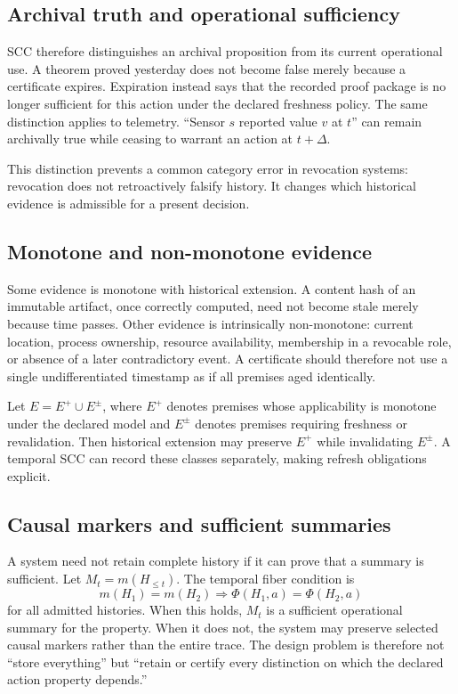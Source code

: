 \documentclass[11pt]{article}
\begin{document}
\subsection{Archival truth and operational sufficiency}
SCC therefore distinguishes an archival proposition from its current operational use. A theorem proved yesterday does not become false merely because a certificate expires. Expiration instead says that the recorded proof package is no longer sufficient for this action under the declared freshness policy. The same distinction applies to telemetry. ``Sensor $s$ reported value $v$ at $t$'' can remain archivally true while ceasing to warrant an action at $t+\Delta$.

This distinction prevents a common category error in revocation systems: revocation does not retroactively falsify history. It changes which historical evidence is admissible for a present decision.

\subsection{Monotone and non-monotone evidence}
Some evidence is monotone with historical extension. A content hash of an immutable artifact, once correctly computed, need not become stale merely because time passes. Other evidence is intrinsically non-monotone: current location, process ownership, resource availability, membership in a revocable role, or absence of a later contradictory event. A certificate should therefore not use a single undifferentiated timestamp as if all premises aged identically.

Let $E=E^{+}\cup E^{\pm}$, where $E^{+}$ denotes premises whose applicability is monotone under the declared model and $E^{\pm}$ denotes premises requiring freshness or revalidation. Then historical extension may preserve $E^{+}$ while invalidating $E^{\pm}$. A temporal SCC can record these classes separately, making refresh obligations explicit.

\subsection{Causal markers and sufficient summaries}
A system need not retain complete history if it can prove that a summary is sufficient. Let $M_t=m(H_{\le t})$. The temporal fiber condition is
\[
m(H_1)=m(H_2)\Longrightarrow
\Phi(H_1,a)=\Phi(H_2,a)
\]
for all admitted histories. When this holds, $M_t$ is a sufficient operational summary for the property. When it does not, the system may preserve selected causal markers rather than the entire trace. The design problem is therefore not ``store everything'' but ``retain or certify every distinction on which the declared action property depends.''
\end{document}
